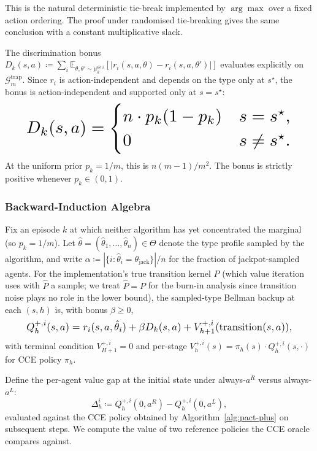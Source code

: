 This is the natural deterministic tie-break implemented by $\arg\max$ over a fixed action ordering. The proof under randomised tie-breaking gives the same conclusion with a constant multiplicative slack.

The discrimination bonus $D_k(s, a) \coloneqq \sum_i \mathbb{E}_{\theta, \theta' \sim \mu_k^{\Theta, i}}[|r_i(s, a, \theta) - r_i(s, a, \theta')|]$ evaluates explicitly on $\mathcal{G}_m^{\mathrm{trap}}$. Since $r_i$ is action-independent and depends on the type only at $s^\star$, the bonus is action-independent and supported only at $s = s^\star$:
\begin{equation}\label{eq:Dk-trap}\resizebox{0.9\linewidth}{!}{$\displaystyle D_k(s, a) = \begin{cases} n \cdot p_k(1 - p_k) & s = s^\star, \\ 0 & s \neq s^\star. \end{cases} $}\end{equation}
At the uniform prior $p_k = 1/m$, this is $n(m-1)/m^2$. The bonus is strictly positive whenever $p_k \in (0, 1)$.

\subsubsection{Backward-Induction Algebra}
\label{app:pact-plus-backward}

Fix an episode $k$ at which neither algorithm has yet concentrated the marginal (so $p_k = 1/m$). Let $\hat\theta = (\hat\theta_1, \ldots, \hat\theta_n) \in \Theta$ denote the type profile sampled by the algorithm, and write $\alpha \coloneqq |\{i : \hat\theta_i = \theta_{\mathrm{jack}}\}|/n$ for the fraction of jackpot-sampled agents. For the implementation's true transition kernel $P$ (which value iteration uses with $\hat P$ a sample; we treat $\hat P = P$ for the burn-in analysis since transition noise plays no role in the lower bound), the sampled-type Bellman backup at each $(s, h)$ is, with bonus $\beta \geq 0$,
\begin{equation}\label{eq:bellman-plus}\resizebox{0.9\linewidth}{!}{$\displaystyle Q^{+, i}_h(s, a) = r_i(s, a, \hat\theta_i) + \beta D_k(s, a) + V^{+, i}_{h+1}(\mathrm{transition}(s, a)), $}\end{equation}
with terminal condition $V^{+, i}_{H+1} = 0$ and per-stage $V^{+, i}_h(s) = \pi_h(s) \cdot Q^{+, i}_h(s, \cdot)$ for CCE policy $\pi_h$.

Define the per-agent value gap at the initial state under always-$a^R$ versus always-$a^L$:
\begin{equation}
\Delta^i_h \coloneqq Q^{+, i}_h(0, a^R) - Q^{+, i}_h(0, a^L),
\end{equation}
evaluated against the CCE policy obtained by Algorithm~\ref{alg:pact-plus} on subsequent steps. We compute the value of two reference policies the CCE oracle compares against.

